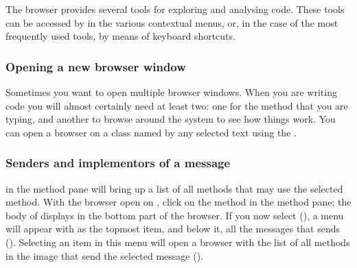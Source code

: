\documentclass[a4paper,10pt,twoside]{book}
\begin{document}
The browser provides several tools for exploring and analysing code.
These tools can be accessed by  in the various contextual menus, or, in the case of the most frequently used tools, by means of keyboard shortcuts.

\subsubsection{Opening a new browser window}

Sometimes you want to open multiple browser windows.
When you are writing code you will almost certainly need at least two: one for the method that you are typing, and another to browse around the system to see how things work.
You can open a browser on a class named by any selected text using the  . 


\subsubsection{Senders and implementors of a message}

  in the method pane will bring up a list of all methods that may use the selected method. With the browser open on , click on the  method in the method pane; the body of  displays in the bottom part of the browser. If you now select  (), a menu will appear with  as the topmost item, and below it, all the messages that  sends ().  Selecting an item in this menu will open a browser with the list of all methods in the image that send the selected message ().
\end{document}
